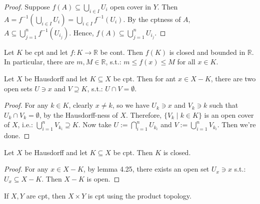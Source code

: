 \begin{proof}
    Suppose $f(A) \subseteq \bigcup_{i \in I} U_i$ open cover in $Y$. Then $A = f^{-1}(\bigcup_{i \in I} U_i) = \bigcup_{i \in I} f^{-1}(U_i)$.
    By the cptness of $A$, $A \subseteq \bigcup_{j=1}^n f^{-1}(U_{i_j})$. Hence, $f(A) \subseteq \bigcup_{j=1}^n U_{i_j}$.
\end{proof}

\begin{corollary}
    Let $K$ be cpt and let $f :K \rightarrow \mathbb{R}$ be cont. Then $f(K)$ is closed and bounded in $\mathbb{R}$. In particular, there are $m,M \in \mathbb{R}$, s.t.: $m \leq f(x) \leq M$ for all $x \in K$.
\end{corollary}

\begin{lemma}
    Let $X$ be Hausdorff and let $K \subseteq X$ be cpt. Then for ant $x \in X-K$, there are two open sets $U \ni x$ and $V \supseteq K$, s.t.: $U \cap V =\emptyset$.
\end{lemma}

\begin{proof}
    For any $k \in K$, clearly $x \neq k$, so we have $U_k \ni x$ and $V_k \ni k$ such that $U_k \cap V_k = \emptyset$, by the Hausdorff-ness of $X$. Therefore, $\{ V_k \mid k \in K\}$ is an open cover of $X$, i.e.: $\bigcup_{i=1}^n V_{k_i} \supseteq K$. Now take $U := \bigcap _{i=1}^n U_{k_i}$ and $V:= \bigcup_{i=1}^n V_{k_i}$. Then we're done.
\end{proof}

\begin{corollary}
    Let $X$ be Hausdorff and let $K \subseteq X$ be cpt. Then $K$ is closed.
\end{corollary}

\begin{proof}
    For any $x \in X-K$, by lemma 4.25, there exists an open set $U_x \ni x$ s.t.: $U_x \subseteq X-K$. Then $X-K$ is open.
\end{proof}

\begin{proposition}
    If $X,Y$ are cpt, then $X \times Y$ is cpt using the product topology.
\end{proposition}

